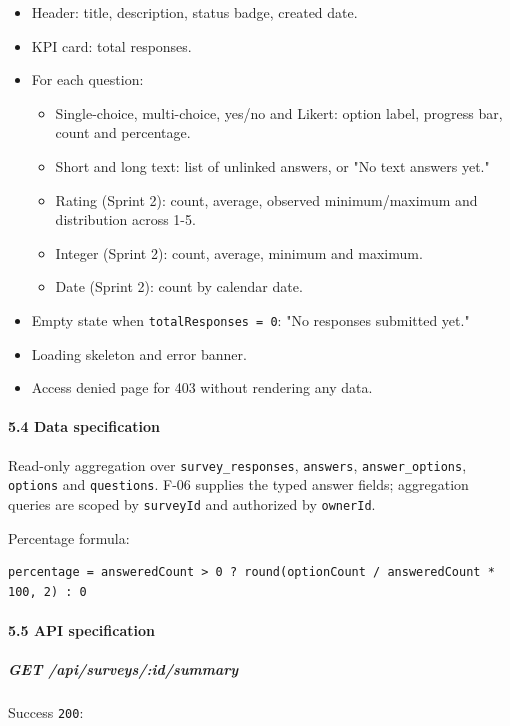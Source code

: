 \documentclass[12pt,a4paper]{article}
\begin{document}
\begin{itemize}[leftmargin=*]
\item Header: title, description, status badge, created date.
\item KPI card: total responses.
\item For each question:
\begin{itemize}[leftmargin=*]
\item Single-choice, multi-choice, yes/no and Likert: option label, progress bar, count and percentage.
\item Short and long text: list of unlinked answers, or "No text answers yet."
\item Rating (Sprint 2): count, average, observed minimum/maximum and distribution across 1-5.
\item Integer (Sprint 2): count, average, minimum and maximum.
\item Date (Sprint 2): count by calendar date.
\end{itemize}
\item Empty state when \texttt{totalResponses = 0}: "No responses submitted yet."
\item Loading skeleton and error banner.
\item Access denied page for 403 without rendering any data.
\end{itemize}

\paragraph*{5.4 Data specification}
Read-only aggregation over \texttt{survey\_responses}, \texttt{answers}, \texttt{answer\_options}, \texttt{options} and \texttt{questions}. F-06 supplies the typed answer fields; aggregation queries are scoped by \texttt{surveyId} and authorized by \texttt{ownerId}.

Percentage formula:

\begin{lstlisting}
percentage = answeredCount > 0 ? round(optionCount / answeredCount * 100, 2) : 0
\end{lstlisting}

\paragraph*{5.5 API specification}
\subparagraph*{GET /api/surveys/:id/summary}
Success \texttt{200}:
\end{document}

